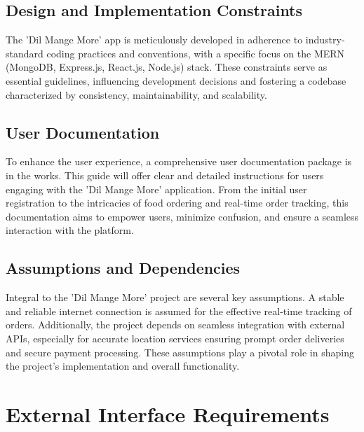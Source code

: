 \documentclass{article}
\begin{document}
\subsection{Design and Implementation Constraints}
The 'Dil Mange More' app is meticulously developed in adherence to industry-standard coding practices and conventions, with a specific focus on the MERN (MongoDB, Express.js, React.js, Node.js) stack. These constraints serve as essential guidelines, influencing development decisions and fostering a codebase characterized by consistency, maintainability, and scalability.

\subsection{User Documentation}
To enhance the user experience, a comprehensive user documentation package is in the works. This guide will offer clear and detailed instructions for users engaging with the 'Dil Mange More' application. From the initial user registration to the intricacies of food ordering and real-time order tracking, this documentation aims to empower users, minimize confusion, and ensure a seamless interaction with the platform.

\subsection{Assumptions and Dependencies}
Integral to the 'Dil Mange More' project are several key assumptions. A stable and reliable internet connection is assumed for the effective real-time tracking of orders. Additionally, the project depends on seamless integration with external APIs, especially for accurate location services ensuring prompt order deliveries and secure payment processing. These assumptions play a pivotal role in shaping the project's implementation and overall functionality.


\newpage
\newpage
\section{External Interface Requirements}
\end{document}
